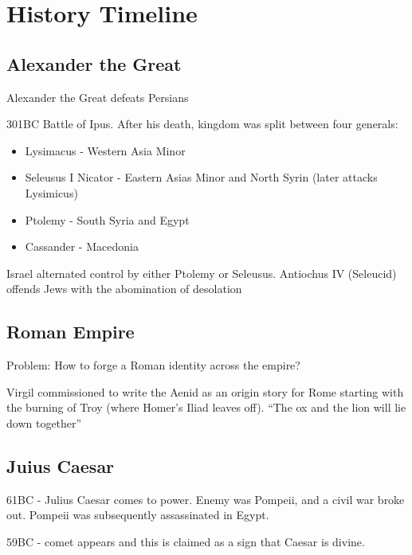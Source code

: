 \documentclass[
]{book}
\providecommand{\tightlist}{%
  \setlength{\itemsep}{0pt}\setlength{\parskip}{0pt}}
\begin{document}
\hypertarget{history-timeline}{%
\section{History Timeline}\label{history-timeline}}

\hypertarget{alexander-the-great}{%
\subsection{Alexander the Great}\label{alexander-the-great}}

Alexander the Great defeats Persians

301BC Battle of Ipus. After his death, kingdom was split between four generals:

\begin{itemize}
\tightlist
\item
  Lysimacus - Western Asia Minor
\item
  Seleusus I Nicator - Eastern Asias Minor and North Syrin (later attacks Lysimicus)
\item
  Ptolemy - South Syria and Egypt
\item
  Cassander - Macedonia
\end{itemize}

Israel alternated control by either Ptolemy or Seleusus. Antiochus IV (Seleucid) offends Jews with the abomination of desolation

\hypertarget{roman-empire}{%
\subsection{Roman Empire}\label{roman-empire}}

Problem: How to forge a Roman identity across the empire?

Virgil commissioned to write the Aenid as an origin story for Rome starting with the burning of Troy (where Homer's Iliad leaves off). ``The ox and the lion will lie down together''

\hypertarget{juius-caesar}{%
\subsection{Juius Caesar}\label{juius-caesar}}

61BC - Julius Caesar comes to power. Enemy was Pompeii, and a civil war broke out. Pompeii was subsequently assassinated in Egypt.

59BC - comet appears and this is claimed as a sign that Caesar is divine.
\end{document}

